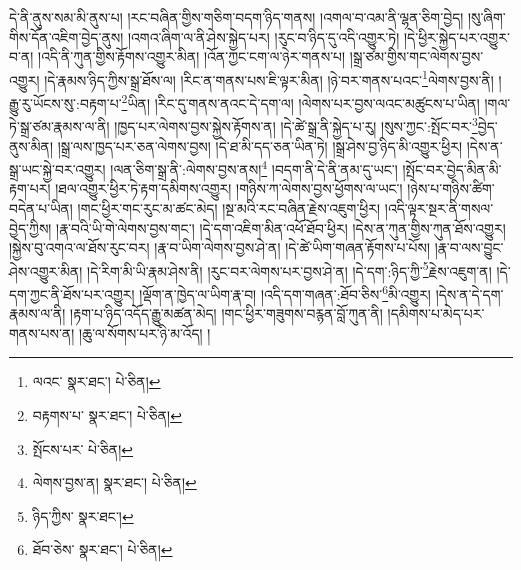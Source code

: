 དེ་ནི་ནུས་སམ་མི་ནུས་པ། །རང་བཞིན་གྱིས་གཅིག་བདག་ཉིད་གནས། །འགལ་བ་འམ་ནི་ལྷན་ཅིག་བྱེད། །སུ་ཞིག་གིས་དོན་འཇིག་བྱེད་ནུས། །འགའ་ཞིག་ལ་ནི་ཤེས་སྐྱེད་པར། །རུང་བ་ཉིད་དུ་འདི་འགྱུར་ཏེ། །དེ་ཕྱིར་སྐྱེད་པར་འགྱུར་བ་ན། །འདི་ནི་ཀུན་གྱིས་རྟོགས་འགྱུར་མིན། །འོན་ཀྱང་ངག་ལ་ཉེར་གནས་པ། །སྒྲ་ཙམ་གྱིས་གང་ལེགས་བྱས་འགྱུར། །དེ་རྣམས་ཉིད་ཀྱིས་སྒྲ་ཐོས་ལ། །རིང་ན་གནས་པས་ཇི་ལྟར་མིན། །ཉེ་བར་གནས་པའང་\footnote{ལའང་  སྣར་ཐང་།  པེ་ཅིན། }ལེགས་བྱས་ནི། །རྒྱུ་རུ་ཡོངས་སུ་:བརྟག་པ་\footnote{བརྟགས་པ་  སྣར་ཐང་།  པེ་ཅིན། }ཡིན། །རིང་དུ་གནས་ནའང་དེ་དག་ལ། །ལེགས་པར་བྱས་ལའང་མཚུངས་པ་ཡིན། །གལ་ཏེ་སྒྲ་ཙམ་རྣམས་ལ་ནི། །ཁྱད་པར་ལེགས་བྱས་སྐྱེས་རྟོགས་ན། །དེ་ཚེ་སྒྲ་ནི་སྐྱེད་པ་རུ། །སུས་ཀྱང་:སྤོང་བར་\footnote{སྤོངས་པར་  པེ་ཅིན། }བྱེད་ནུས་མིན། །སྒྲ་ལས་ཁྱད་པར་ཅན་ལེགས་བྱས། །དེ་ཐ་མི་དད་ཅན་ཡིན་ཏེ། །སྒྲ་ཤེས་བྱ་ཉིད་མི་འགྱུར་ཕྱིར། །དེས་ན་སྒྲ་ཡང་སྐྱེ་བར་འགྱུར། །ལན་ཅིག་སྒྲ་ནི་:ལེགས་བྱས་ནས།\footnote{ལེགས་བྱས་ན།  སྣར་ཐང་།  པེ་ཅིན། } །བདག་ནི་དེ་ནི་ནམ་དུ་ཡང་། །སྤོང་བར་བྱེད་མིན་མི་རྟག་པར། །ཐལ་འགྱུར་ཕྱིར་ཏེ་རྟག་དམིགས་འགྱུར། །གཉིས་ཀ་ལེགས་བྱས་ཕྱོགས་ལ་ཡང་། །ཉེས་པ་གཉིས་ཚིག་བདེན་པ་ཡིན། །གང་ཕྱིར་གང་རུང་མ་ཚང་མེད། །སྔ་མའི་རང་བཞིན་རྗེས་འཇུག་ཕྱིར། །འདི་ལྟར་སྔར་ནི་གསལ་བྱེད་ཀྱིས། །རྣ་བའི་ཡི་གེ་ལེགས་བྱས་གང་། །དེ་དག་འཇིག་མིན་འཕོ་ཐོབ་ཕྱིར། །དེས་ན་ཀུན་གྱིས་ཀུན་ཐོས་འགྱུར། །སྐྱེས་བུ་འགའ་ལ་ཐོས་རུང་བར། །རྣ་བ་ཡིག་ལེགས་བྱས་ཤེ་ན། །དེ་ཚེ་ཡིག་གཞན་རྟོགས་པ་པོས། །རྣ་བ་ལས་བྱུང་ཤེས་འགྱུར་མིན། །དེ་རིག་མི་ཡི་རྣམ་ཤེས་ནི། །རུང་བར་ལེགས་པར་བྱས་ཤེ་ན། །དེ་དག་:ཉིད་ཀྱི་\footnote{ཉིད་ཀྱིས་  སྣར་ཐང་། }རྗེས་འཇུག་ན། །དེ་དག་ཀྱང་ནི་ཐོས་པར་འགྱུར། །ལྡོག་ན་ཁྱེད་ལ་ཡིག་རྣ་བ། །འདི་དག་གཞན་:ཐོབ་ཅིས་\footnote{ཐོབ་ཅེས་  སྣར་ཐང་།  པེ་ཅིན། }མི་འགྱུར། །དེས་ན་དེ་དག་རྣམས་ལ་ནི། །རྟག་པ་ཉིད་འདོད་རྒྱུ་མཚན་མེད། །གང་ཕྱིར་གཟུགས་བརྙན་བློ་ཀུན་ནི། །དམིགས་པ་མེད་པར་གནས་པས་ན། །ཆུ་ལ་སོགས་པར་ཉི་མ་འོད། །
